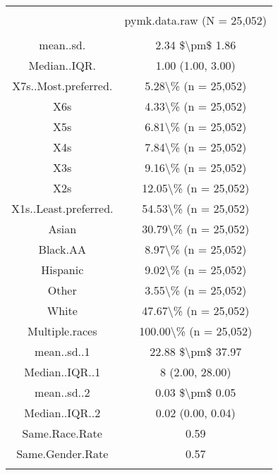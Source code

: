 
\begin{table}[!htbp] \centering 
  \caption{} 
  \label{} 
\begin{tabular}{@{\extracolsep{5pt}} cc} 
\\[-1.8ex]\hline 
\hline \\[-1.8ex] 
 & pymk.data.raw (N = 25,052) \\ 
\hline \\[-1.8ex] 
mean..sd. & 2.34 \$\textbackslash pm\$ 1.86 \\ 
Median..IQR. & 1.00 (1.00, 3.00) \\ 
X7s..Most.preferred. & 5.28\textbackslash \% (n = 25,052) \\ 
X6s & 4.33\textbackslash \% (n = 25,052) \\ 
X5s & 6.81\textbackslash \% (n = 25,052) \\ 
X4s & 7.84\textbackslash \% (n = 25,052) \\ 
X3s & 9.16\textbackslash \% (n = 25,052) \\ 
X2s & 12.05\textbackslash \% (n = 25,052) \\ 
X1s..Least.preferred. & 54.53\textbackslash \% (n = 25,052) \\ 
Asian & 30.79\textbackslash \% (n = 25,052) \\ 
Black.AA & 8.97\textbackslash \% (n = 25,052) \\ 
Hispanic & 9.02\textbackslash \% (n = 25,052) \\ 
Other & 3.55\textbackslash \% (n = 25,052) \\ 
White & 47.67\textbackslash \% (n = 25,052) \\ 
Multiple.races & 100.00\textbackslash \% (n = 25,052) \\ 
mean..sd..1 & 22.88 \$\textbackslash pm\$ 37.97 \\ 
Median..IQR..1 & 8 (2.00, 28.00) \\ 
mean..sd..2 & 0.03 \$\textbackslash pm\$ 0.05 \\ 
Median..IQR..2 & 0.02 (0.00, 0.04) \\ 
Same.Race.Rate & 0.59 \\ 
Same.Gender.Rate & 0.57 \\ 
\hline \\[-1.8ex] 
\end{tabular} 
\end{table} 
